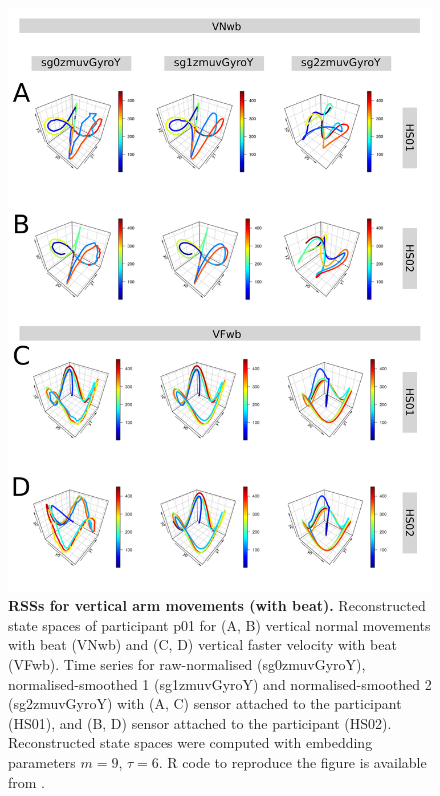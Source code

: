 \begin{figure}[!h]
\centering
\includegraphics[height=0.8\textheight]{rss_Vwb_w500}
\caption{
	{\bf RSSs for vertical arm movements (with beat).}
	Reconstructed state spaces of participant p01 for 
	(A, B) vertical normal movements with beat (VNwb) and 
	(C, D) vertical faster velocity with beat (VFwb).
	Time series for raw-normalised (sg0zmuvGyroY), 
	normalised-smoothed 1 (sg1zmuvGyroY) and 
	normalised-smoothed 2 (sg2zmuvGyroY) with
	(A, C) sensor attached to the participant (HS01), and
	(B, D) sensor attached to the participant (HS02).	
	Reconstructed state spaces were computed with 
	embedding parameters $m=9$, $\tau=6$.
	R code to reproduce the figure is available from \cite{hwum2018}.
        }
     \label{fig:rss_Vwb_w500}
\end{figure}




